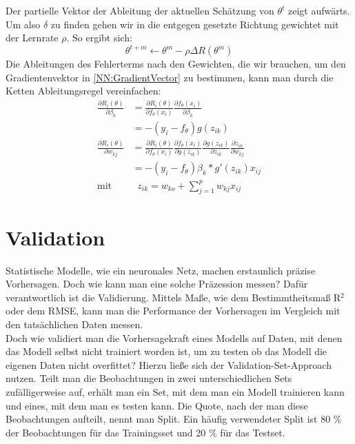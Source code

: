 \documentclass[a4paper,12pt]{thesis}
\begin{document}
Der partielle Vektor der Ableitung der aktuellen Schätzung von $\theta^t$ zeigt aufwärts. Um also $\delta$ zu finden gehen wir in die entgegen gesetzte Richtung gewichtet mit der Lernrate $\rho$. So ergibt sich:
\begin{equation}
	\label{NN:Lernfunktion}
	\theta^{t+m} \leftarrow \theta^m -\rho \Delta R(\theta^m)
\end{equation}
Die Ableitungen des Fehlerterms nach den Gewichten, die wir brauchen, um den Gradientenvektor in \ref{NN:GradientVector} zu bestimmen, kann man durch die Ketten Ableitungsregel vereinfachen:
\begin{equation}
	\label{NN:ChainRule}
	\begin{aligned}
		\frac{\partial R_i(\theta)}{\partial \beta_k}& = \frac{\partial R_i(\theta)}{\partial f_{\theta} (x_i)} \frac{\partial f_{\theta} (x_i)}{\partial \beta_k}\\
		& = -(y_i - f_{\theta})g(z_{ik})\\
		\frac{\partial R_i(\theta)}{\partial w_{kj}}& = \frac{\partial R_i(\theta)}{\partial f_{\theta} (x_i)} \frac{\partial f_{\theta} (x_i)}{\partial g(z_{ik})} \frac{\partial g(z_{ik}) }{\partial z_{ik}} \frac{\partial z_{ik}}{\partial w_{kj}}\\
		& = -(y_i - f_{\theta})\beta_k*g'(z_{ik})x_{ij}\\
		\text{mit}& \; \; z_{ik}=w_{ko}+ \sum^p_{j=1}w_{kj}x_{ij}
	\end{aligned} 
\end{equation}

\section{Validation}

Statistische Modelle, wie ein neuronales Netz, machen erstaunlich präzise Vorhersagen. Doch wie kann man eine solche Präzession messen? Dafür verantwortlich ist die Validierung. Mittels Maße, wie dem Bestimmtheitsmaß R$^2$ oder dem RMSE, kann man die Performance der Vorhersagen im Vergleich mit den tatsächlichen Daten messen.\\
Doch wie validiert man die Vorhersagekraft eines Modells auf Daten, mit denen das Modell selbst nicht trainiert worden ist, um zu testen ob das Modell die eigenen Daten nicht overfittet? Hierzu ließe sich der Validation-Set-Approach nutzen. Teilt man die Beobachtungen in zwei unterschiedlichen Sets zufälligerweise auf, erhält man ein Set, mit dem man ein Modell trainieren kann und eines, mit dem man es testen kann. Die Quote, nach der man diese Beobachtungen aufteilt, nennt man Split. Ein häufig verwendeter Split ist 80 \% der Beobachtungen für das Trainingsset und 20 \% für das Testset.
\end{document}
